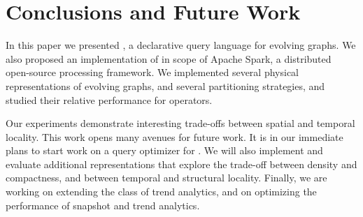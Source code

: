\section{Conclusions and Future Work}
\label{sec:conc}

In this paper we presented \ql, a declarative query language for
evolving graphs.  We also proposed an implementation of \ql in scope
of Apache Spark, a distributed open-source processing framework.  We
implemented several physical representations of evolving graphs, and
several partitioning strategies, and studied their relative
performance for \ql operators.  

Our experiments demonstrate interesting trade-offs between spatial and
temporal locality.  This work opens many avenues for future work.  It
is in our immediate plans to start work on a query optimizer for \ql.
We will also implement and evaluate additional \tg representations
that explore the trade-off between density and compactness, and
between temporal and structural locality.  Finally, we are working on
extending the class of trend analytics, and on optimizing the
performance of snapshot and trend analytics.

